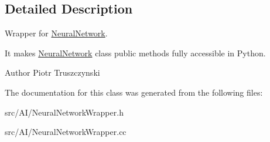 \subsection{Detailed Description}
Wrapper for \hyperlink{classNeuralNetwork}{Neural\+Network}. 

It makes \hyperlink{classNeuralNetwork}{Neural\+Network} class public methods fully accessible in Python. \begin{DoxyAuthor}{Author}
Piotr Truszczynski 
\end{DoxyAuthor}


The documentation for this class was generated from the following files\+:\begin{DoxyCompactItemize}
\item 
src/\+A\+I/Neural\+Network\+Wrapper.\+h\item 
src/\+A\+I/Neural\+Network\+Wrapper.\+cc\end{DoxyCompactItemize}
